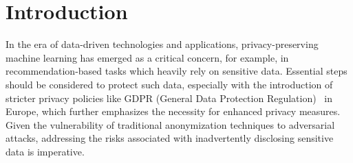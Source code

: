 \documentclass{article}
\begin{document}
% 
% 
% 





\section{Introduction}
In the era of data-driven technologies and applications, privacy-preserving machine learning has emerged as a critical concern, for example, in recommendation-based tasks which heavily rely on sensitive data. Essential steps should be considered to protect such data, especially with the introduction of stricter privacy policies like GDPR (General Data Protection Regulation)~\citep{gdpr} in Europe, which further emphasizes the necessity for enhanced privacy measures. Given the vulnerability of traditional anonymization techniques to adversarial attacks, addressing the risks associated with inadvertently disclosing sensitive data is imperative.
\end{document}
